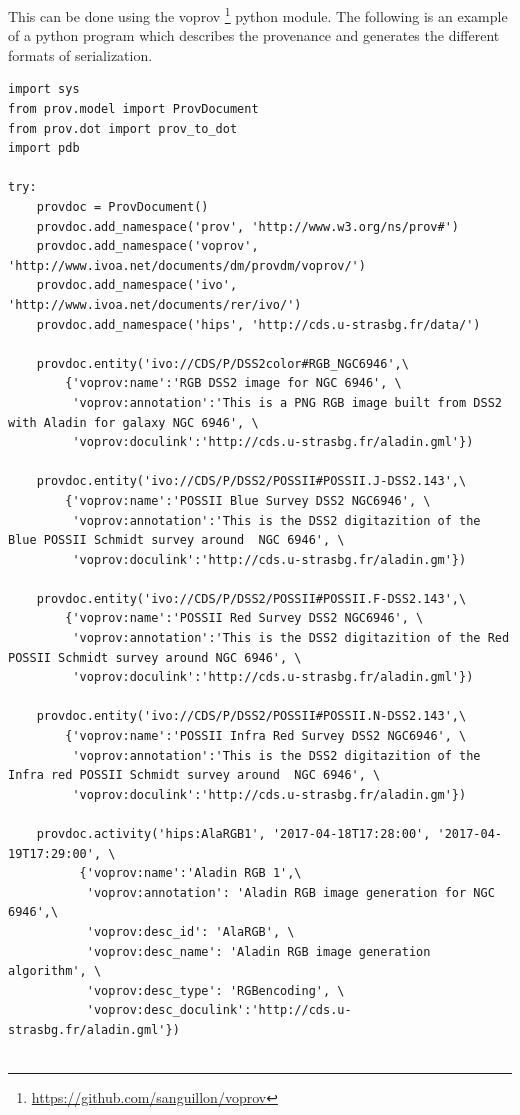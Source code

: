 This can be done using the voprov \footnote{\url{https://github.com/sanguillon/voprov}} python module.
The following is an example of a python program which describes the provenance and generates the different formats of serialization.
\begin{verbatim}
import sys
from prov.model import ProvDocument
from prov.dot import prov_to_dot
import pdb

try:
    provdoc = ProvDocument()
    provdoc.add_namespace('prov', 'http://www.w3.org/ns/prov#')
    provdoc.add_namespace('voprov', 'http://www.ivoa.net/documents/dm/provdm/voprov/')
    provdoc.add_namespace('ivo', 'http://www.ivoa.net/documents/rer/ivo/')
    provdoc.add_namespace('hips', 'http://cds.u-strasbg.fr/data/')

    provdoc.entity('ivo://CDS/P/DSS2color#RGB_NGC6946',\
        {'voprov:name':'RGB DSS2 image for NGC 6946', \
         'voprov:annotation':'This is a PNG RGB image built from DSS2 with Aladin for galaxy NGC 6946', \
         'voprov:doculink':'http://cds.u-strasbg.fr/aladin.gml'})

    provdoc.entity('ivo://CDS/P/DSS2/POSSII#POSSII.J-DSS2.143',\
        {'voprov:name':'POSSII Blue Survey DSS2 NGC6946', \
         'voprov:annotation':'This is the DSS2 digitazition of the Blue POSSII Schmidt survey around  NGC 6946', \
         'voprov:doculink':'http://cds.u-strasbg.fr/aladin.gm'})

    provdoc.entity('ivo://CDS/P/DSS2/POSSII#POSSII.F-DSS2.143',\
        {'voprov:name':'POSSII Red Survey DSS2 NGC6946', \
         'voprov:annotation':'This is the DSS2 digitazition of the Red POSSII Schmidt survey around NGC 6946', \
         'voprov:doculink':'http://cds.u-strasbg.fr/aladin.gml'})

    provdoc.entity('ivo://CDS/P/DSS2/POSSII#POSSII.N-DSS2.143',\
        {'voprov:name':'POSSII Infra Red Survey DSS2 NGC6946', \
         'voprov:annotation':'This is the DSS2 digitazition of the Infra red POSSII Schmidt survey around  NGC 6946', \
         'voprov:doculink':'http://cds.u-strasbg.fr/aladin.gm'})

    provdoc.activity('hips:AlaRGB1', '2017-04-18T17:28:00', '2017-04-19T17:29:00', \
          {'voprov:name':'Aladin RGB 1',\
           'voprov:annotation': 'Aladin RGB image generation for NGC 6946',\
           'voprov:desc_id': 'AlaRGB', \
           'voprov:desc_name': 'Aladin RGB image generation algorithm', \
           'voprov:desc_type': 'RGBencoding', \
           'voprov:desc_doculink':'http://cds.u-strasbg.fr/aladin.gml'})


\end{verbatim}
